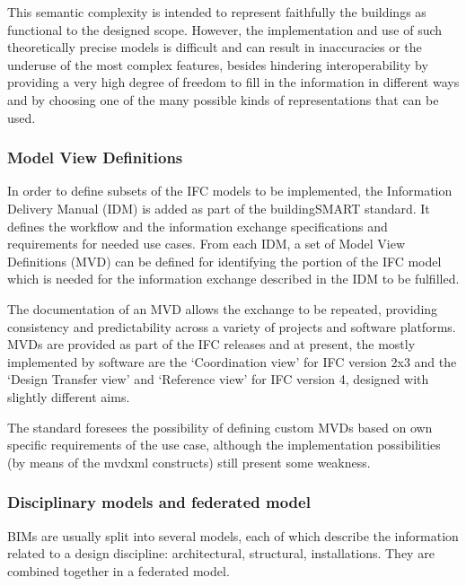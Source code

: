 This semantic complexity is intended to represent faithfully the buildings as functional to the designed scope.
However, the implementation and use of such theoretically precise models is difficult and can result in inaccuracies or the underuse of the most complex features, besides hindering interoperability by providing a very high degree of freedom to fill in the information in different ways and by choosing one of the many possible kinds of representations that can be used.


\subsubsection{Model View Definitions}

In order to define subsets of the IFC models to be implemented, the Information Delivery Manual (IDM) is added as part of the buildingSMART standard.
It defines the workflow and the information exchange specifications and requirements for needed use cases.
From each IDM, a set of Model View Definitions (MVD) can be defined for identifying the portion of the IFC model which is needed for the information exchange described in the IDM to be fulfilled.

The documentation of an MVD allows the exchange to be repeated, providing consistency and predictability across a variety of projects and software platforms.
MVDs are provided as part of the IFC releases and at present, the mostly implemented by software are the `Coordination view' for IFC version 2x3 and the `Design Transfer view' and `Reference view' for IFC version 4, designed with slightly different aims.

The standard foresees the possibility of defining custom MVDs based on own specific requirements of the use case, although the implementation possibilities (by means of the mvdxml constructs) still present some weakness.


\subsubsection{Disciplinary models and federated model}\label{sec:fedmodels}

BIMs are usually split into several models, each of which describe the information related to a design discipline: architectural, structural, installations.
They are combined together in a federated model.

